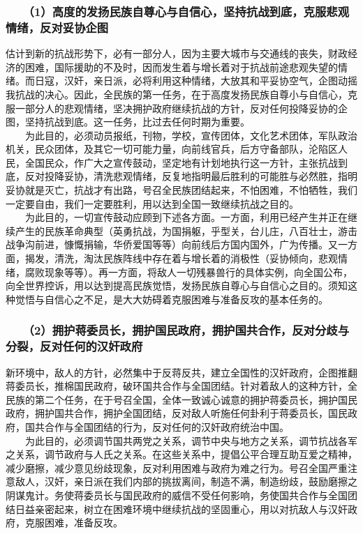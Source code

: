 \documentclass[cn,11pt,chinese]{elegantbook}
\def\myformat#1{\hfil\hfil #1}
\begin{document}
\subsubsection*{\myformat{　　（1）高度的发扬民族自尊心与自信心，坚持抗战到底，克服悲观情绪，反对妥协企图}}
估计到新的抗战形势下，必有一部分人，因为主要大城市与交通线的丧失，财政经济的困难，国际援助的不及时，因而发生着与增长着对于抗战前途悲观失望的情绪。而日寇，汉奸，亲日派，必将利用这种情绪，大放其和平妥协空气，企图动摇我抗战的决心。因此，全民族的第一任务，在于高度发扬民族自尊小与自信心，克服一部分人的悲观情绪，坚决拥护政府继续抗战的方针，反对任何投降妥协的企图，坚持抗战到底。这一任务，比过去任何时期为重要。\\
　　为此目的，必须动员报纸，刊物，学校，宣传团体，文化艺术团体，军队政治机关，民众团体，及其它一切可能力量，向前线官兵，后方守备部队，沦陷区人民，全国民众，作广大之宣传鼓动，坚定地有计划地执行这一方针，主张抗战到底，反对投降妥协，清洗悲观情绪，反复地指明最后胜利的可能胜与必然胜，指明妥协就是灭亡，抗战才有出路，号召全民族团结起来，不怕困难，不怕牺牲，我们一定要自由，我们一定要胜利，用以达到全国一致继续抗战之目的。\\
　　为此目的，一切宣传鼓动应顾到下述各方面。一方面，利用已经产生并正在继续产生的民族革命典型（英勇抗战，为国捐躯，乎型关，台儿庄，八百壮士，游击战争沟前进，慷慨捐输，华侨爱国等等）向前线后方国内国外，广为传播。又一方面，揭发，清洗，淘汰民族阵线中存在着与增长着的消极性（妥协倾向，悲观情绪，腐败现象等等）。再一方面，将敌人一切残暴兽行的具体实例，向全国公布，向全世界控诉，用以达到提高民族觉悟，发扬民族自尊心与自信心之目的。须知这种觉悟与自信心之不足，是大大妨碍着克服困难与准备反攻的基本任务的。\\
\subsubsection*{\myformat{　　（2）拥护蒋委员长，拥护国民政府，拥护国共合作，反对分歧与分裂，反对任何的汉奸政府}}
新环境中，敌人的方针，必然集中于反蒋反共，建立全国性的汉奸政府，企图推翻蒋委员长，推棉国民政府，破环国共合作与全国团结。针对着敌人的这种方针，全民族的第二个任务，在于号召全国，全体一致诚心诚意的拥护蒋委员长，拥护国民政府，拥护国共合作，拥护全国团结，反对敌人听施任何卦利于蒋委员长，国民政府，国共合作与全国团结的行为，反对任何的汉奸政府统治中国。\\
　　为此目的，必须调节国共两党之关系，调节中央与地方之关系，调节抗战各军之关系，调节政府与人氏之关系。在这些关系中，提倡公平合理互助互爱之精神，减少磨擦，减少意见纷歧现象，反对利用困难与政府为难之行为。号召全国严重注意敌人，汉奸，亲日派在我们内部的挑拔离间，制造不满，制造纷歧，鼓励磨擦之阴谋鬼计。务使蒋委员长与国民政府的威信不受任何影响，务使国共合作与全国团结日益亲密起来，树立在困难环境中继续抗战的坚固重心，用以对抗敌人与汉奸政府，克服困难，准备反攻。\\
\end{document}
